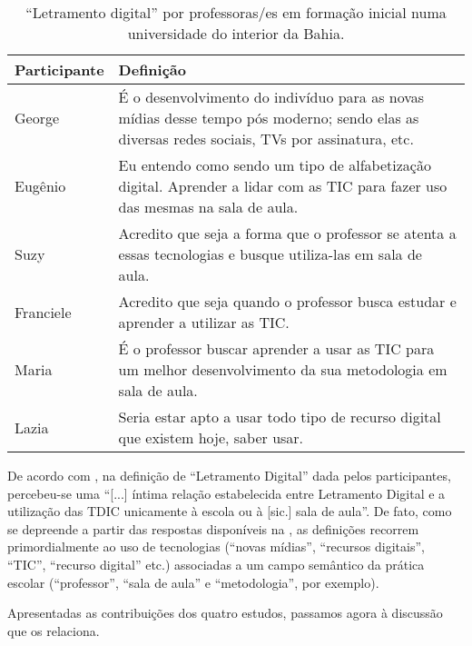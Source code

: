 \documentclass[portuguese]{textolivre}
\begin{document}
\begin{table}[h!]
\centering
\begin{threeparttable}
\caption{“Letramento digital” por professoras/es em formação inicial numa universidade do interior da Bahia.}
\label{Tabela04}
\begin{tabular}{lp{}}
\toprule
Participante\footnotemark & Definição\\
\midrule
George & É o desenvolvimento do indivíduo para as novas mídias desse tempo pós moderno; sendo elas as diversas redes sociais, TVs por assinatura, etc.\\
Eugênio & Eu entendo como sendo um tipo de alfabetização digital. Aprender a lidar com as TIC para fazer uso das mesmas na sala de aula.\\
Suzy & Acredito que seja a forma que o professor se atenta a essas tecnologias e busque utiliza-las em sala de aula.\\
Franciele & Acredito que seja quando o professor busca estudar e aprender a utilizar as TIC. \\
Maria & É o professor buscar aprender a usar as TIC para um melhor desenvolvimento da sua metodologia em sala de aula. \\
Lazia & Seria estar apto a usar todo tipo de recurso digital que existem hoje, saber usar.\\
\bottomrule
\end{tabular}
\end{threeparttable}
\end{table}


De acordo com \textcite[p.~446]{_santos_letramento_2018}, na definição de “Letramento Digital” dada pelos participantes, percebeu-se uma “[...] íntima relação estabelecida entre Letramento Digital e a utilização das TDIC unicamente à escola ou à [sic.] sala de aula”. De fato, como se depreende a partir das respostas disponíveis na , as definições recorrem primordialmente ao uso de tecnologias (“novas mídias”, “recursos digitais”, “TIC”, “recurso digital” etc.) associadas a um campo semântico da prática escolar (“professor”, “sala de aula” e “metodologia”, por exemplo).

Apresentadas as contribuições dos quatro estudos, passamos agora à discussão que os relaciona.
\end{document}
